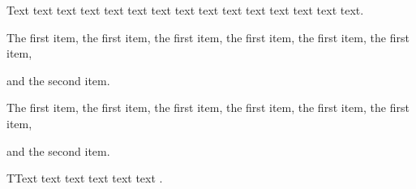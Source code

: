 Text text text text text text text text text text text text text text text.

\begin{listi}
	\item The first item, the first item, the first item, the first item, the first item, the first item,
	\item and the second item.
\end{listi}

\begin{lista}
	\item The first item, the first item, the first item, the first item, the first item, the first item, 
	\item and the second item.
\end{lista}

TText text text text text text \citet{Blomstrom2003}. 